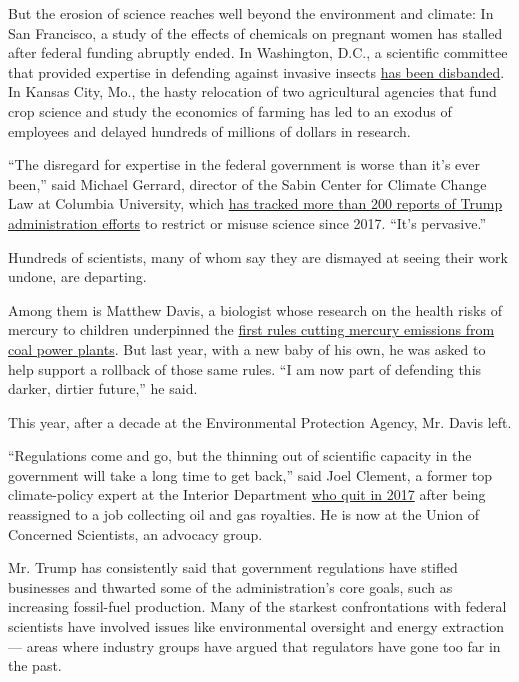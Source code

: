 But the erosion of science reaches well beyond the environment and
climate: In San Francisco, a study of the effects of chemicals on
pregnant women has stalled after federal funding abruptly ended. In
Washington, D.C., a scientific committee that provided expertise in
defending against invasive insects
\href{https://www.doi.gov/invasivespecies/isac-resources}{has been
disbanded}. In Kansas City, Mo., the hasty relocation of two
agricultural agencies that fund crop science and study the economics of
farming has led to an exodus of employees and delayed hundreds of
millions of dollars in research.

``The disregard for expertise in the federal government is worse than
it's ever been,'' said Michael Gerrard, director of the Sabin Center for
Climate Change Law at Columbia University, which
\href{https://climate.law.columbia.edu/Silencing-Science-Tracker}{has
tracked more than 200 reports of Trump administration efforts} to
restrict or misuse science since 2017. ``It's pervasive.''

Hundreds of scientists, many of whom say they are dismayed at seeing
their work undone, are departing.

Among them is Matthew Davis, a biologist whose research on the health
risks of mercury to children underpinned the
\href{https://green.blogs.nytimes3xbfgragh.onion/2011/12/21/e-p-a-announces-mercury-limits/}{first
rules cutting mercury emissions from coal power plants}. But last year,
with a new baby of his own, he was asked to help support a rollback of
those same rules. ``I am now part of defending this darker, dirtier
future,'' he said.

This year, after a decade at the Environmental Protection Agency, Mr.
Davis left.

``Regulations come and go, but the thinning out of scientific capacity
in the government will take a long time to get back,'' said Joel
Clement, a former top climate-policy expert at the Interior Department
\href{https://www.washingtonpost.com/opinions/im-a-scientist-the-trump-administration-reassigned-me-for-speaking-up-about-climate-change/2017/07/19/389b8dce-6b12-11e7-9c15-177740635e83_story.html}{who
quit in 2017} after being reassigned to a job collecting oil and gas
royalties. He is now at the Union of Concerned Scientists, an advocacy
group.

Mr. Trump has consistently said that government regulations have stifled
businesses and thwarted some of the administration's core goals, such as
increasing fossil-fuel production. Many of the starkest confrontations
with federal scientists have involved issues like environmental
oversight and energy extraction --- areas where industry groups have
argued that regulators have gone too far in the past.

